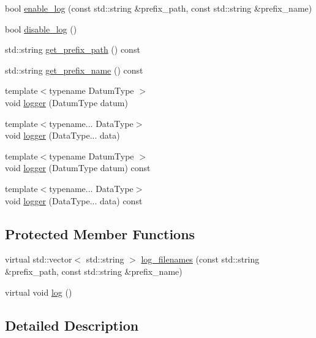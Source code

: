 \begin{DoxyCompactItemize}
bool \mbox{\hyperlink{classbfl_1_1Logger_ae94b97b6e8d7902e8ce048384813122e}{enable\+\_\+log}} (const std\+::string \&prefix\+\_\+path, const std\+::string \&prefix\+\_\+name)
\item 
bool \mbox{\hyperlink{classbfl_1_1Logger_a440467a28ccc46490d767fe0ef6f556a}{disable\+\_\+log}} ()
\item 
std\+::string \mbox{\hyperlink{classbfl_1_1Logger_a56cf1a4e712bf23d9978420a8a59a62b}{get\+\_\+prefix\+\_\+path}} () const
\item 
std\+::string \mbox{\hyperlink{classbfl_1_1Logger_a913a795b7bfbf378815eeb342d68a7c0}{get\+\_\+prefix\+\_\+name}} () const
\item 
{\footnotesize template$<$typename Datum\+Type $>$ }\\void \mbox{\hyperlink{classbfl_1_1Logger_a1033ff31398484f2132f84fd140da9e3}{logger}} (Datum\+Type datum)
\item 
{\footnotesize template$<$typename... Data\+Type$>$ }\\void \mbox{\hyperlink{classbfl_1_1Logger_aca2086c9256e5c404872b91f7f25b97d}{logger}} (Data\+Type... data)
\item 
{\footnotesize template$<$typename Datum\+Type $>$ }\\void \mbox{\hyperlink{classbfl_1_1Logger_a50b1c109730fa98f66e66f420f0158fe}{logger}} (Datum\+Type datum) const
\item 
{\footnotesize template$<$typename... Data\+Type$>$ }\\void \mbox{\hyperlink{classbfl_1_1Logger_a0f0cf7ce956546d94dfb1feb7cebf171}{logger}} (Data\+Type... data) const
\end{DoxyCompactItemize}
\subsection*{Protected Member Functions}
\begin{DoxyCompactItemize}
\item 
virtual std\+::vector$<$ std\+::string $>$ \mbox{\hyperlink{classbfl_1_1Logger_a328ceaa8e70e6918f11142b12b8be217}{log\+\_\+filenames}} (const std\+::string \&prefix\+\_\+path, const std\+::string \&prefix\+\_\+name)
\item 
virtual void \mbox{\hyperlink{classbfl_1_1Logger_ad44f46593cb8c4c87c1178eb326e2f64}{log}} ()
\end{DoxyCompactItemize}


\subsection{Detailed Description}


